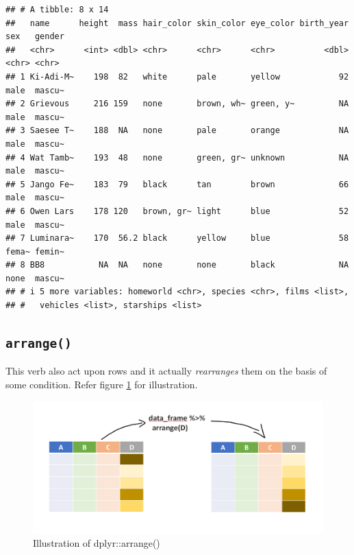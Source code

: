 \documentclass[
]{book}
\begin{document}
\begin{verbatim}
## # A tibble: 8 x 14
##   name      height  mass hair_color skin_color eye_color birth_year sex   gender
##   <chr>      <int> <dbl> <chr>      <chr>      <chr>          <dbl> <chr> <chr> 
## 1 Ki-Adi-M~    198  82   white      pale       yellow            92 male  mascu~
## 2 Grievous     216 159   none       brown, wh~ green, y~         NA male  mascu~
## 3 Saesee T~    188  NA   none       pale       orange            NA male  mascu~
## 4 Wat Tamb~    193  48   none       green, gr~ unknown           NA male  mascu~
## 5 Jango Fe~    183  79   black      tan        brown             66 male  mascu~
## 6 Owen Lars    178 120   brown, gr~ light      blue              52 male  mascu~
## 7 Luminara~    170  56.2 black      yellow     blue              58 fema~ femin~
## 8 BB8           NA  NA   none       none       black             NA none  mascu~
## # i 5 more variables: homeworld <chr>, species <chr>, films <list>,
## #   vehicles <list>, starships <list>
\end{verbatim}

\hypertarget{arrange}{%
\subsection{\texorpdfstring{\texttt{arrange()}}{arrange()}}\label{arrange}}

This verb also act upon rows and it actually \emph{rearranges} them on the basis of some condition. Refer figure \ref{fig:arranger} for illustration.

\begin{figure}

{\centering \includegraphics[width=0.99\linewidth]{images/arrange_dplyr} 

}

\caption{Illustration of dplyr::arrange()}\label{fig:arranger}
\end{figure}
\end{document}
